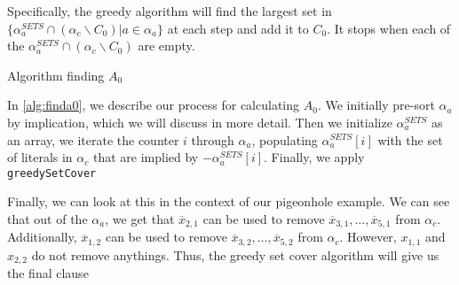 Specifically, the greedy algorithm will find the largest set in $\{\alpha_a^{SETS} \cap (\alpha_c \backslash C_0) | a \in \alpha_a \}$ at each step and add it to $C_0$. It stops when each of the $\alpha_a^{SETS} \cap (\alpha_c \backslash C_0)$ are empty.


\begin{algorithm}
    \caption{Algorithm finding $A_0$}\label{alg:finda0}
    \SetAlgoNoLine
\end{algorithm}

In \autoref{alg:finda0}, we describe our process for calculating $A_0$. We initially pre-sort $\alpha_a$ by implication, which we will discuss in more detail. Then we initialize $\alpha_a^{SETS}$ as an array, we iterate the counter $i$ through $\alpha_a$, populating $\alpha_a^{SETS}[i]$ with the set of literals in $\alpha_c$ that are implied by $-\alpha_a^{SETS}[i]$. Finally, we apply \texttt{greedySetCover}

Finally, we can look at this in the context of our pigeonhole example. We can see that out of the $\alpha_a$, we get that $\overline{x}_{2, 1}$ can be used to remove $\overline{x}_{3, 1}, \ldots, \overline{x}_{5, 1}$ from $\alpha_c$. Additionally, $\overline{x}_{1, 2}$ can be used to remove $\overline{x}_{3, 2}, \ldots, \overline{x}_{5, 2}$ from $\alpha_c$. However, $x_{1, 1}$ and $x_{2, 2}$ do not remove anythings. Thus, the greedy set cover algorithm will give us the final clause 


